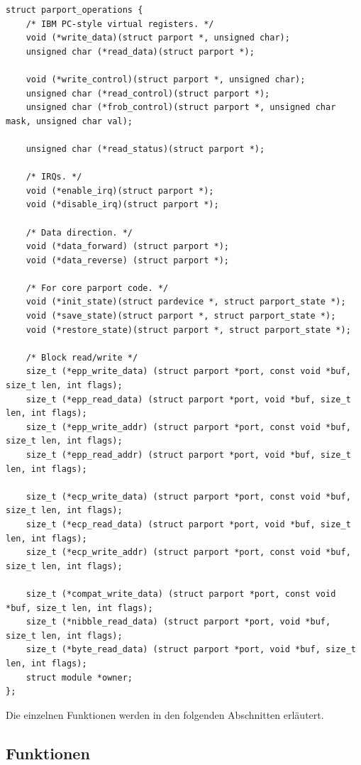 \documentclass[a4paper,11pt]{article}
\begin{document}
\begin{verbatim}
struct parport_operations {
    /* IBM PC-style virtual registers. */
    void (*write_data)(struct parport *, unsigned char);
    unsigned char (*read_data)(struct parport *);

    void (*write_control)(struct parport *, unsigned char);
    unsigned char (*read_control)(struct parport *);
    unsigned char (*frob_control)(struct parport *, unsigned char mask, unsigned char val);

    unsigned char (*read_status)(struct parport *);

    /* IRQs. */
    void (*enable_irq)(struct parport *);
    void (*disable_irq)(struct parport *);

    /* Data direction. */
    void (*data_forward) (struct parport *);
    void (*data_reverse) (struct parport *);

    /* For core parport code. */
    void (*init_state)(struct pardevice *, struct parport_state *);
    void (*save_state)(struct parport *, struct parport_state *);
    void (*restore_state)(struct parport *, struct parport_state *);

    /* Block read/write */
    size_t (*epp_write_data) (struct parport *port, const void *buf, size_t len, int flags);
    size_t (*epp_read_data) (struct parport *port, void *buf, size_t len, int flags);
    size_t (*epp_write_addr) (struct parport *port, const void *buf, size_t len, int flags);
    size_t (*epp_read_addr) (struct parport *port, void *buf, size_t len, int flags);

    size_t (*ecp_write_data) (struct parport *port, const void *buf, size_t len, int flags);
    size_t (*ecp_read_data) (struct parport *port, void *buf, size_t len, int flags);
    size_t (*ecp_write_addr) (struct parport *port, const void *buf, size_t len, int flags);

    size_t (*compat_write_data) (struct parport *port, const void *buf, size_t len, int flags);
    size_t (*nibble_read_data) (struct parport *port, void *buf, size_t len, int flags);
    size_t (*byte_read_data) (struct parport *port, void *buf, size_t len, int flags);
    struct module *owner;
};\end{verbatim} 

Die einzelnen Funktionen werden in den folgenden Abschnitten erläutert.

\subsection{Funktionen}
\end{document}
